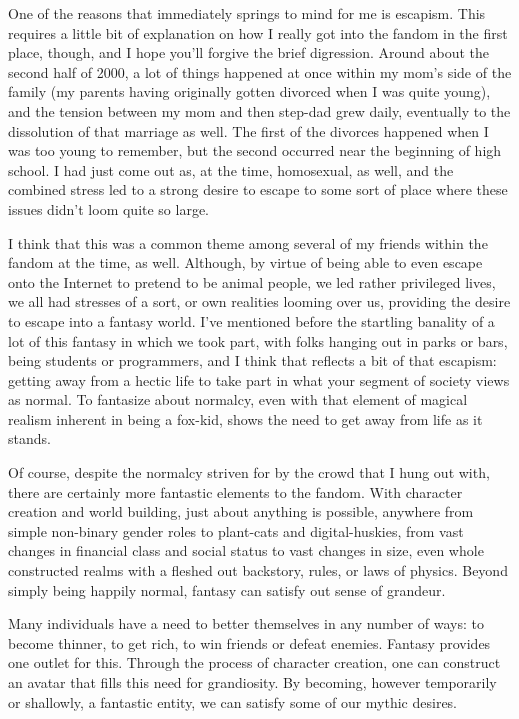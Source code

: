 One of the reasons that immediately springs to mind for me is escapism. This requires a little bit of explanation on how I really got into the fandom in the first place, though, and I hope you'll forgive the brief digression. Around about the second half of 2000, a lot of things happened at once within my mom's side of the family (my parents having originally gotten divorced when I was quite young), and the tension between my mom and then step-dad grew daily, eventually to the dissolution of that marriage as well. The first of the divorces happened when I was too young to remember, but the second occurred near the beginning of high school.  I had just come out as, at the time, homosexual, as well, and the combined stress led to a strong desire to escape to some sort of place where these issues didn't loom quite so large.

I think that this was a common theme among several of my friends within the fandom at the time, as well. Although, by virtue of being able to even escape onto the Internet to pretend to be animal people, we led rather privileged lives, we all had stresses of a sort, or own realities looming over us, providing the desire to escape into a fantasy world. I've mentioned before the startling banality of a lot of this fantasy in which we took part, with folks hanging out in parks or bars, being students or programmers, and I think that reflects a bit of that escapism: getting away from a hectic life to take part in what your segment of society views as normal. To fantasize about normalcy, even with that element of magical realism inherent in being a fox-kid, shows the need to get away from life as it stands.

Of course, despite the normalcy striven for by the crowd that I hung out with, there are certainly more fantastic elements to the fandom.  With character creation and world building, just about anything is possible, anywhere from simple non-binary gender roles to plant-cats and digital-huskies, from vast changes in financial class and social status to vast changes in size, even whole constructed realms with a fleshed out backstory, rules, or laws of physics. Beyond simply being happily normal, fantasy can satisfy out sense of grandeur.

Many individuals have a need to better themselves in any number of ways: to become thinner, to get rich, to win friends or defeat enemies. Fantasy provides one outlet for this.  Through the process of character creation, one can construct an avatar that fills this need for grandiosity. By becoming, however temporarily or shallowly, a fantastic entity, we can satisfy some of our mythic desires.

